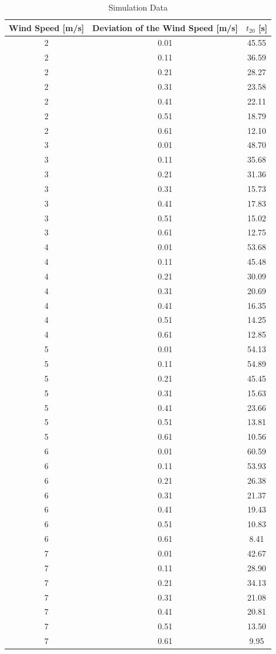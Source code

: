  \begin{table}[H] 
 \centering 
 \begin{tabular}{|c|c|c|}
 \hline
 Wind Speed [m/s]& Deviation of the Wind Speed [m/s]&  $t_{20}$ [s] \\ \hline \hline
   2  & 0.01  & 45.55 \\ \hline
 2  & 0.11  & 36.59\\ \hline
 2  & 0.21 & 28.27\\ \hline
 2  & 0.31  & 23.58\\ \hline
 2  & 0.41  & 22.11 \\ \hline
 2  & 0.51  & 18.79\\ \hline
 2  & 0.61  & 12.10\\ \hline
 3  & 0.01  & 48.70\\ \hline
 3  & 0.11  & 35.68\\ \hline
 3  & 0.21  & 31.36\\ \hline
 3  & 0.31  & 15.73\\ \hline
 3  & 0.41  & 17.83\\ \hline
 3  & 0.51  & 15.02\\ \hline
 3  & 0.61  & 12.75\\ \hline
 4  & 0.01  & 53.68\\ \hline
 4  & 0.11  & 45.48\\ \hline
 4  & 0.21  & 30.09\\ \hline
 4  & 0.31  & 20.69\\ \hline
 4  & 0.41 & 16.35\\ \hline
 4  & 0.51  & 14.25\\ \hline
 4  & 0.61  & 12.85\\ \hline
 5  & 0.01  & 54.13\\ \hline
 5  & 0.11  & 54.89\\ \hline
 5  & 0.21  & 45.45\\ \hline
 5  & 0.31  & 15.63\\ \hline
 5  & 0.41 & 23.66\\ \hline
 5  & 0.51  & 13.81\\ \hline
 5  & 0.61  & 10.56\\ \hline
 6  & 0.01  & 60.59\\ \hline
 6  & 0.11  & 53.93\\ \hline
 6  & 0.21  & 26.38\\ \hline
 6  & 0.31  & 21.37\\ \hline
 6  & 0.41 & 19.43\\ \hline
 6  & 0.51  & 10.83\\ \hline
 6  & 0.61  & 8.41\\ \hline
 7  & 0.01  & 42.67\\ \hline
 7  & 0.11  & 28.90\\ \hline
 7  & 0.21  & 34.13\\ \hline
 7  & 0.31  & 21.08\\ \hline
 7  & 0.41  & 20.81\\ \hline
 7  & 0.51  & 13.50\\ \hline
 7  & 0.61  & 9.95\\ \hline
 \end{tabular}%
 \caption{Simulation Data} 
 \label{tab: sim}%
 \end{table}%
